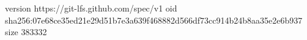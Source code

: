 version https://git-lfs.github.com/spec/v1
oid sha256:07e68ce35ed21e29d51b7e3a639f468882d566df73cc914b24b8aa35e2e6b937
size 383332
